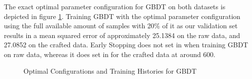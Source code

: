 The exact optimal parameter configuration for GBDT on both datasets is depicted in figure \ref{fig:GBDT_Optimal}. Training GBDT with the optimal parameter configuration using the full available amount of samples with 20\% of it as our validation set results in a mean squared error of approximately 25.1384 on the raw data, and 27.0852 on the crafted data. Early Stopping does not set in when training GBDT on raw data, whereas it does set in for the crafted data at around 600. 
\begin{figure}[h]
	\centering
	\caption{Optimal Configurations and Training Histories for GBDT}
	\label{fig:GBDT_Optimal}
\end{figure}

